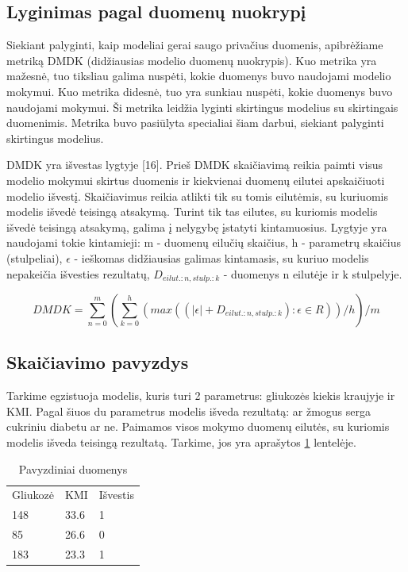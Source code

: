 \documentclass{VUMIFInfBakalaurinis}
\begin{document}
\subsection{Lyginimas pagal duomenų nuokrypį}

\par Siekiant palyginti, kaip modeliai gerai saugo privačius duomenis, apibrėžiame metriką DMDK (didžiausias modelio duomenų nuokrypis). Kuo metrika yra mažesnė, tuo tiksliau galima nuspėti, kokie duomenys buvo naudojami modelio mokymui. Kuo metrika didesnė, tuo yra sunkiau nuspėti, kokie duomenys buvo naudojami mokymui. Ši metrika leidžia lyginti skirtingus modelius su skirtingais duomenimis. Metrika buvo pasiūlyta specialiai šiam darbui, siekiant palyginti skirtingus modelius.
\par DMDK yra išvestas lygtyje [16]. Prieš DMDK skaičiavimą reikia paimti visus modelio mokymui skirtus duomenis ir kiekvienai duomenų eilutei apskaičiuoti modelio išvestį. Skaičiavimus reikia atlikti tik su tomis eilutėmis, su kuriuomis modelis išvedė teisingą atsakymą. Turint tik tas eilutes, su kuriomis modelis išvedė teisingą atsakymą, galima į nelygybę įstatyti kintamuosius. Lygtyje yra naudojami tokie kintamieji: m - duomenų eilučių skaičius, h - parametrų skaičius (stulpeliai), $\epsilon$ - ieškomas didžiausias galimas kintamasis, su kuriuo modelis nepakeičia išvesties rezultatų, $D_{eilut.:n, stulp.:k}$ - duomenys n eilutėje ir k stulpelyje.

\begin{equation}
DMDK = {\sum_{n=0}^{m} ({\sum_{k=0}^{h} (max((|\epsilon| + D_{eilut.:n, stulp.:k}) : \epsilon \in R))}/{h})}/{m}
\end{equation} 

\subsection{Skaičiavimo pavyzdys}
\par Tarkime egzistuoja modelis, kuris turi 2 parametrus: gliukozės kiekis kraujyje ir KMI. Pagal šiuos du parametrus modelis išveda rezultatą: ar žmogus serga cukriniu diabetu ar ne. Paimamos visos mokymo duomenų eilutės, su kuriomis modelis išveda teisingą rezultatą. Tarkime, jos yra aprašytos \ref{tab:my-table0} lentelėje.

\begin{table}[h]
\centering
\begin{tabular}{|l|l|l|}
\cline{1-3}
Gliukozė & KMI  & Išvestis \\\cline{1-3}
148      & 33.6 & 1        \\\cline{1-3}
85       & 26.6 & 0        \\\cline{1-3}
183      & 23.3 & 1        \\\cline{1-3}
\end{tabular}
\caption{Pavyzdiniai duomenys}
\label{tab:my-table0}
\end{table}
\end{document}
